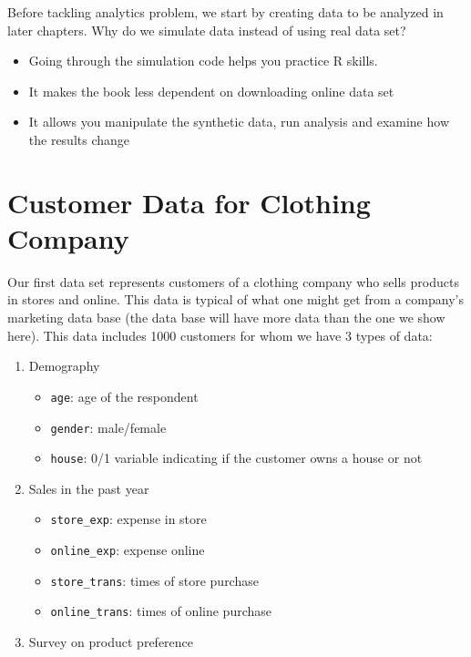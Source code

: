 \documentclass[]{book}
\providecommand{\tightlist}{%
  \setlength{\itemsep}{0pt}\setlength{\parskip}{0pt}}
\theoremstyle{definition}
\theoremstyle{definition}
\theoremstyle{remark}
\begin{document}
Before tackling analytics problem, we start by creating data to be
analyzed in later chapters. Why do we simulate data instead of using
real data set?

\begin{itemize}
\tightlist
\item
  Going through the simulation code helps you practice R skills.
\item
  It makes the book less dependent on downloading online data set
\item
  It allows you manipulate the synthetic data, run analysis and examine
  how the results change
\end{itemize}

\section{Customer Data for Clothing
Company}\label{customer-data-for-clothing-company}

Our first data set represents customers of a clothing company who sells
products in stores and online. This data is typical of what one might
get from a company's marketing data base (the data base will have more
data than the one we show here). This data includes 1000 customers for
whom we have 3 types of data:

\begin{enumerate}
\def\labelenumi{\arabic{enumi}.}
\tightlist
\item
  Demography

  \begin{itemize}
  \tightlist
  \item
    \texttt{age}: age of the respondent
  \item
    \texttt{gender}: male/female
  \item
    \texttt{house}: 0/1 variable indicating if the customer owns a house
    or not
  \end{itemize}
\item
  Sales in the past year

  \begin{itemize}
  \tightlist
  \item
    \texttt{store\_exp}: expense in store
  \item
    \texttt{online\_exp}: expense online
  \item
    \texttt{store\_trans}: times of store purchase
  \item
    \texttt{online\_trans}: times of online purchase
  \end{itemize}
\item
  Survey on product preference
\end{enumerate}
\end{document}

